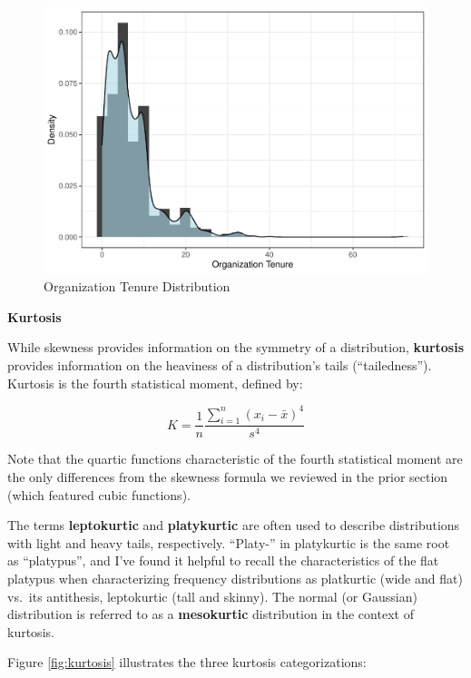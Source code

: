 \documentclass[
]{book}
\begin{document}
\begin{figure}

{\centering \includegraphics{People_Analytics_Lifecycle_files/figure-latex/org-tenure-distribution-1} 

}

\caption{Organization Tenure Distribution}\label{fig:org-tenure-distribution}
\end{figure}

\textbf{Kurtosis}

While skewness provides information on the symmetry of a distribution, \textbf{kurtosis} provides information on the heaviness of a distribution's tails (``tailedness''). Kurtosis is the fourth statistical moment, defined by:

\[ K = \frac{1}{n} \frac{\displaystyle\sum_{i=1}^{n} (x_i-\bar{x})^4}{s^4} \]

Note that the quartic functions characteristic of the fourth statistical moment are the only differences from the skewness formula we reviewed in the prior section (which featured cubic functions).

The terms \textbf{leptokurtic} and \textbf{platykurtic} are often used to describe distributions with light and heavy tails, respectively. ``Platy-'' in platykurtic is the same root as ``platypus'', and I've found it helpful to recall the characteristics of the flat platypus when characterizing frequency distributions as platkurtic (wide and flat) vs.~its antithesis, leptokurtic (tall and skinny). The normal (or Gaussian) distribution is referred to as a \textbf{mesokurtic} distribution in the context of kurtosis.

Figure \ref{fig:kurtosis} illustrates the three kurtosis categorizations:
\end{document}
